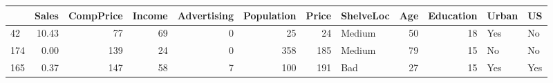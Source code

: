 \begin{tabular}{lrrrrrrlrrll}
\toprule
{} &  Sales &  CompPrice &  Income &  Advertising &  Population &  Price & ShelveLoc &  Age &  Education & Urban &   US \\
\midrule
42  &  10.43 &         77 &      69 &            0 &          25 &     24 &    Medium &   50 &         18 &   Yes &   No \\
174 &   0.00 &        139 &      24 &            0 &         358 &    185 &    Medium &   79 &         15 &    No &   No \\
165 &   0.37 &        147 &      58 &            7 &         100 &    191 &       Bad &   27 &         15 &   Yes &  Yes \\
\bottomrule
\end{tabular}
